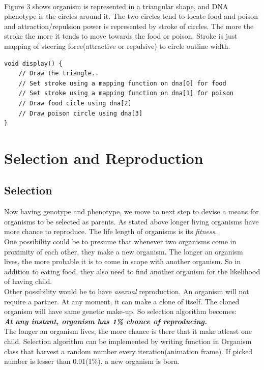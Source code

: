 \documentclass[conference]{IEEEtran}
\begin{document}
\\Figure 3 shows organism is represented in a triangular shape, and DNA phenotype is the circles around it. The two circles tend to locate food and poison and attraction/repulsion power is represented by stroke of circles. The more the stroke the more it tends to move towards the food or poison. Stroke is just mapping of steering force(attractive or repulsive) to circle outline width.
\begin{lstlisting}[caption = Adding Phenotype in Organism class]
void display() {
	// Draw the triangle..
	// Set stroke using a mapping function on dna[0] for food
	// Set stroke using a mapping function on dna[1] for poison
	// Draw food cicle using dna[2]
	// Draw poison circle using dna[3]
}
\end{lstlisting}

\section{Selection and Reproduction}
\subsection{Selection}
Now having genotype and phenotype, we move to next step to devise a means for organisms to be selected as parents. As stated above longer living organisms have more chance to reproduce. The life length of organisms is its \textit{fitness}.\\
One possibility could be to presume that whenever two organisms come in proximity of each other, they make a new organism. The longer an organism lives, the more probable it is to come in scope with another organism. So in addition to eating food, they also need to find another organism for the likelihood of having child.\\
Other possibility would be to have \textit{asexual} reproduction. An organism will not require a partner. At any moment, it can make a clone of itself. The cloned organism will have same genetic make-up. So selection algorithm becomes:\\
\textbf{\textit{At any instant, organism has 1\% chance of reproducing.}}\\
The longer an organism lives, the more chance is there that it make atleast one child. Selection algorithm can be implemented by writing function in Organism class that harvest a random number every iteration(animation frame). If picked number is lesser than 0.01(1\%), a new organism is born.
\end{document}
